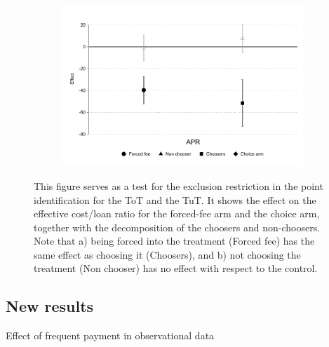 \begin{figure}[H]
     \caption{Exclusion restriction}
     \label{exclusion_restriction}
    \begin{center}
    \begin{subfigure}{0.6\textwidth}
        \centering
        \includegraphics[width=\textwidth]{Figuras/exclusion_restriction.pdf}
    \end{subfigure}
    \end{center}
    \scriptsize This figure serves as a test for the exclusion restriction in the point identification for the ToT and the TuT. It shows the effect on the effective cost/loan ratio for the forced-fee arm and the choice arm, together with the decomposition of the choosers and non-choosers. Note that a) being forced into the treatment (Forced fee) has the same effect as choosing it (Choosers), and b) not choosing the treatment (Non chooser) has no effect with respect to the control.
    
\end{figure}


\newpage 

\subsection{New results}


\begin{table}[H]
\caption{Effect of frequent payment in observational data}
\label{attrition_table}
\begin{center}
\scriptsize{}
\end{center}
 \scriptsize 
\end{table}


